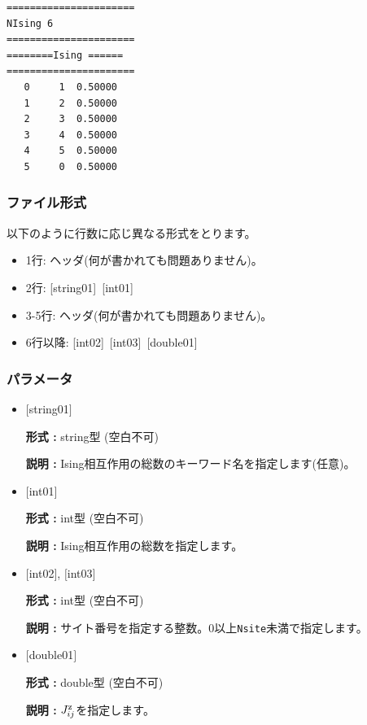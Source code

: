 \begin{minipage}{12.5cm}
\begin{screen}
\begin{verbatim}
====================== 
NIsing 6  
====================== 
========Ising ====== 
====================== 
   0     1  0.50000
   1     2  0.50000
   2     3  0.50000
   3     4  0.50000
   4     5  0.50000
   5     0  0.50000
\end{verbatim}
\end{screen}
\end{minipage}

\subsubsection{ファイル形式}
以下のように行数に応じ異なる形式をとります。
 \begin{itemize}
   \item  1行:  ヘッダ(何が書かれても問題ありません)。
   \item  2行:   [string01]~[int01]
   \item  3-5行:  ヘッダ(何が書かれても問題ありません)。
   \item  6行以降:
   [int02]~[int03]~[double01] 
  \end{itemize}
\subsubsection{パラメータ}
 \begin{itemize}

   \item  $[$string01$]$
   
    {\bf 形式 :} string型 (空白不可)

   {\bf 説明 :} Ising相互作用の総数のキーワード名を指定します(任意)。

   \item  $[$int01$]$
   
    {\bf 形式 :} int型 (空白不可)

   {\bf 説明 :} Ising相互作用の総数を指定します。

  \item  $[$int02$]$, $[$int03$]$
  
 {\bf 形式 :} int型 (空白不可)

{\bf 説明 :} サイト番号を指定する整数。0以上\verb|Nsite|{未満}で指定します。
 
 \item  $[$double01$]$
   
   {\bf 形式 :} double型 (空白不可)

  {\bf 説明 :}  $J_{ij}^{\rm z}$を指定します。
  
\end{itemize}

